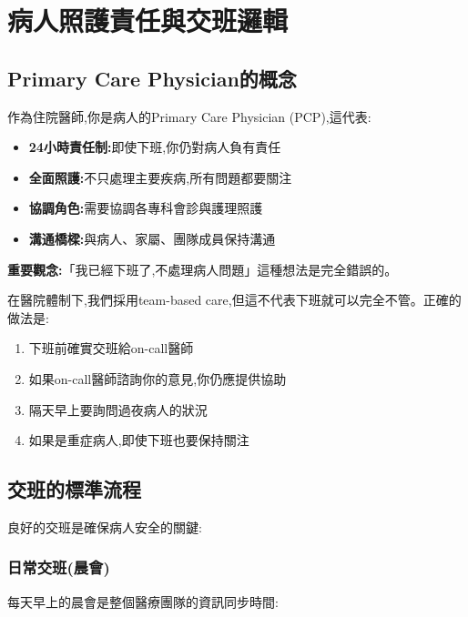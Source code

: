 \documentclass[12pt,a4paper]{article}
\begin{document}
\section{病人照護責任與交班邏輯}

\subsection{Primary Care Physician的概念}

作為住院醫師,你是病人的Primary Care Physician (PCP),這代表:

\begin{itemize}[leftmargin=*]
\item \textbf{24小時責任制:}即使下班,你仍對病人負有責任
\item \textbf{全面照護:}不只處理主要疾病,所有問題都要關注
\item \textbf{協調角色:}需要協調各專科會診與護理照護
\item \textbf{溝通橋樑:}與病人、家屬、團隊成員保持溝通
\end{itemize}

\begin{importantbox}
\textbf{重要觀念:}「我已經下班了,不處理病人問題」這種想法是完全錯誤的。

在醫院體制下,我們採用team-based care,但這不代表下班就可以完全不管。正確的做法是:
\begin{enumerate}
\item 下班前確實交班給on-call醫師
\item 如果on-call醫師諮詢你的意見,你仍應提供協助
\item 隔天早上要詢問過夜病人的狀況
\item 如果是重症病人,即使下班也要保持關注
\end{enumerate}
\end{importantbox}

\subsection{交班的標準流程}

良好的交班是確保病人安全的關鍵:

\subsubsection{日常交班(晨會)}

每天早上的晨會是整個醫療團隊的資訊同步時間:
\end{document}

